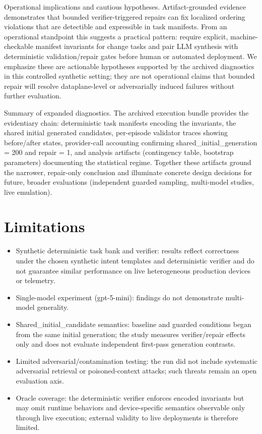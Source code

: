 \documentclass[conference]{IEEEtran}
\begin{document}
Operational implications and cautious hypotheses. Artifact-grounded evidence demonstrates that bounded verifier-triggered repairs can fix localized ordering violations that are detectible and expressible in task manifests. From an operational standpoint this suggests a practical pattern: require explicit, machine-checkable manifest invariants for change tasks and pair LLM synthesis with deterministic validation/repair gates before human or automated deployment. We emphasize these are actionable hypotheses supported by the archived diagnostics in this controlled synthetic setting; they are not operational claims that bounded repair will resolve dataplane-level or adversarially induced failures without further evaluation.

Summary of expanded diagnostics. The archived execution bundle provides the evidentiary chain: deterministic task manifests encoding the invariants, the shared initial generated candidates, per-episode validator traces showing before/after states, provider-call accounting confirming shared\_initial\_generation = 200 and repair = 1, and analysis artifacts (contingency table, bootstrap parameters) documenting the statistical regime. Together these artifacts ground the narrower, repair-only conclusion and illuminate concrete design decisions for future, broader evaluations (independent guarded sampling, multi-model studies, live emulation).

\section{Limitations}
\begin{itemize}
\item Synthetic deterministic task bank and verifier: results reflect correctness under the chosen synthetic intent templates and deterministic verifier and do not guarantee similar performance on live heterogeneous production devices or telemetry.
\item Single-model experiment (gpt-5-mini): findings do not demonstrate multi-model generality.
\item Shared\_initial\_candidate semantics: baseline and guarded conditions began from the same initial generation; the study measures verifier/repair effects only and does not evaluate independent first-pass generation contrasts.
\item Limited adversarial/contamination testing: the run did not include systematic adversarial retrieval or poisoned-context attacks; such threats remain an open evaluation axis.
\item Oracle coverage: the deterministic verifier enforces encoded invariants but may omit runtime behaviors and device-specific semantics observable only through live execution; external validity to live deployments is therefore limited.
\end{itemize}
\end{document}
